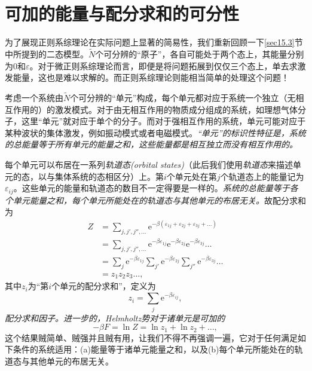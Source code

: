 \section{可加的能量与配分求和的可分性}\label{sec16.2}

为了展现正则系综理论在实际问题上显著的简易性，我们重新回顾一下\ref{sec15.3}节中所提到的二态模型。$\tilde N$个可分辨的``原子''，各自可能处于两个态上，其能量分别为$0$和$\varepsilon$。对于微正则系综理论而言，即便是将问题拓展到仅仅三个态上，单去求激发能量，这也是难以求解的。而正则系综理论则能相当简单的处理这个问题！

考虑一个系统由$\tilde N$个可分辨的``单元''构成，每个单元都对应于系统一个独立（无相互作用的）的激发模式。对于由无相互作用的物质成分组成的系统，如理想气体分子，这里``单元''就对应于单个的分子。而对于强相互作用的系统，单元可能对应于某种波状的集体激发，例如振动模式或者电磁模式。{\it ``单元''的标识性特征是，系统的总能量等于所有单元的能量之和，这些能量都是相互独立而没有相互作用的。}

每个单元可以布居在一系列{\it 轨道态(orbital states)}（此后我们使用{\it 轨道态}来描述单元的态，以与集体系统的态相区分）上。第$i$个单元处在第$j$个轨道态上的能量记为$\varepsilon_{ij}$。这些单元的能量和轨道态的数目不一定得要是一样的。{\it 系统的总能量等于各个单元能量之和，每个单元所能处在的轨道态与其他单元的布居无关。}故配分求和为
\begin{align}
Z &= \sum\limits_{j,j',j'',\dots}\mathrm e^{-\beta (\varepsilon_{1j}+\varepsilon_{2j}+\varepsilon_{3j}+\dots)}\label{equ16.14} \\
 &= \sum\limits_{j,j',j'',\dots}\mathrm e^{-\beta\varepsilon_{1j}}\mathrm e^{-\beta\varepsilon_{2j}}\mathrm e^{-\beta\varepsilon_{3j}}\dots \\
 &= \sum\limits_{j}\mathrm e^{-\beta\varepsilon_{1j}}\sum\limits_{j'}\mathrm e^{-\beta\varepsilon_{2j}}\sum\limits_{j''}\mathrm e^{-\beta\varepsilon_{3j}}\dots \\
 &= z_1z_2z_3\dots, \label{equ16.17}
\end{align}
其中$z_i$为“第$i$个单元的配分求和”，定义为
\begin{equation}
z_i = \sum\limits_{j}\mathrm e^{-\beta\varepsilon_{ij}},
\end{equation}
{\it 配分求和因子。进一步的，Helmholtz势对于诸单元是可加的}
\begin{equation}
-\beta F = \ln Z = \ln z_1+\ln z_2+\dots, \label{equ16.21}
\end{equation}
这个结果贼简单、贼强并且贼有用，让我们不得不再强调一遍，它对于任何满足如下条件的系统适用：(a)能量等于诸单元能量之和，以及(b)每个单元所能处在的轨道态与其他单元的布居无关。

